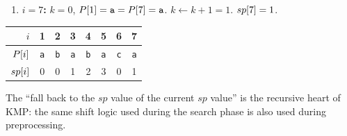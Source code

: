 \begin{enumerate}[noitemsep, topsep=3pt]
\begin{figure}[H]
\caption{Fallback chain at step $i=6$ for $P=\texttt{ababaca}$.
  The three rows show \emph{all} borders of $P[1..5]=\texttt{ababa}$
  (lengths $3$, $1$, $0$), tried longest first.
  For each candidate $k$, the violet cells show the matched suffix
  $P[i-k..i-1]=P[1..k]$; the orange cell is the character $P[k+1]$
  we would need at position $i$ to extend it.
  All three fail, so $sp\kern0pt[6]=0$.}
\label{fig:sp-fallback-trace}
\end{figure}

  \item \textbf{$i=7$:} $k=0$, $P\kern0pt[1]=\texttt{a} = P\kern0pt[7]=\texttt{a}$. $k \gets k+1 = 1$. $sp\kern0pt[7] = 1$.
\end{enumerate}

\begin{center}
\begin{tabular}{rccccccc}
  \toprule
  $i$    & 1 & 2 & 3 & 4 & 5 & 6 & 7 \\
  \midrule
  $P\kern0pt[i]$ & \texttt{a} & \texttt{b} & \texttt{a} & \texttt{b} & \texttt{a} & \texttt{c} & \texttt{a} \\
  $sp\kern0pt[i]$ & 0 & 0 & 1 & 2 & 3 & 0 & 1 \\
  \bottomrule
\end{tabular}
\end{center}

\begin{remark}
  The ``fall back to the $sp$ value of the current $sp$ value'' is the recursive
  heart of KMP: the same shift logic used during the search phase is also used
  during preprocessing.
\end{remark}

